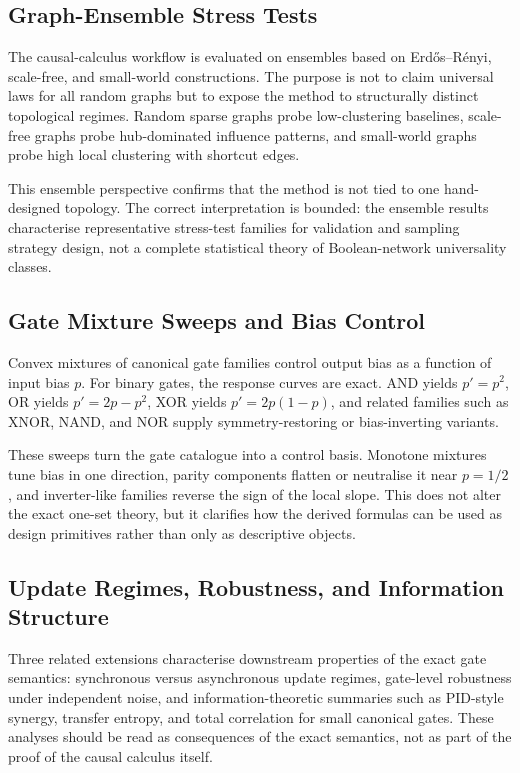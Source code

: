 \documentclass[11pt]{article}
\theoremstyle{definition}
\begin{document}
\subsection{Graph-Ensemble Stress Tests}
The causal-calculus workflow is evaluated on ensembles based on Erd\H{o}s--R\'enyi, scale-free, and small-world constructions. The purpose is not to claim universal laws for all random graphs but to expose the method to structurally distinct topological regimes. Random sparse graphs probe low-clustering baselines, scale-free graphs probe hub-dominated influence patterns, and small-world graphs probe high local clustering with shortcut edges.

This ensemble perspective confirms that the method is not tied to one hand-designed topology. The correct interpretation is bounded: the ensemble results characterise representative stress-test families for validation and sampling strategy design, not a complete statistical theory of Boolean-network universality classes.

\subsection{Gate Mixture Sweeps and Bias Control}
Convex mixtures of canonical gate families control output bias as a function of input bias \(p\). For binary gates, the response curves are exact. AND yields \(p'=p^2\), OR yields \(p'=2p-p^2\), XOR yields \(p'=2p(1-p)\), and related families such as XNOR, NAND, and NOR supply symmetry-restoring or bias-inverting variants.

These sweeps turn the gate catalogue into a control basis. Monotone mixtures tune bias in one direction, parity components flatten or neutralise it near \(p=1/2\), and inverter-like families reverse the sign of the local slope. This does not alter the exact one-set theory, but it clarifies how the derived formulas can be used as design primitives rather than only as descriptive objects.

\subsection{Update Regimes, Robustness, and Information Structure}
Three related extensions characterise downstream properties of the exact gate semantics: synchronous versus asynchronous update regimes, gate-level robustness under independent noise, and information-theoretic summaries such as PID-style synergy, transfer entropy, and total correlation for small canonical gates. These analyses should be read as consequences of the exact semantics, not as part of the proof of the causal calculus itself.
\end{document}
